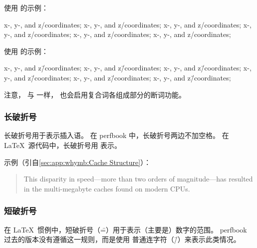 使用 \qco{\\-/} 的示例：

\begin{center}\begin{minipage}{2.55in}\vspace{0.6\baselineskip}
x-, y-, and z\-/coordinates; x-, y-, and z\-/coordinates;
x-, y-, and z\-/coordinates; x-, y-, and z\-/coordinates;
x-, y-, and z\-/coordinates; x-, y-, and z\-/coordinates;
\vspace{0.6\baselineskip}\end{minipage}\end{center}

使用 \qco{\\=/} 的示例：

\begin{center}\begin{minipage}{2.55in}\vspace{0.6\baselineskip}
x-, y-, and z\=/coordinates; x-, y-, and z\=/coordinates;
x-, y-, and z\=/coordinates; x-, y-, and z\=/coordinates;
x-, y-, and z\=/coordinates; x-, y-, and z\=/coordinates;
\vspace{0.6\baselineskip}\end{minipage}\end{center}

注意，\qco{\\=/} 与 \qco{\\-/} 一样，
也会启用复合词各组成部分的断词功能。

\subsubsection{长破折号}
\label{sec:app:styleguide:Em Dash}

长破折号用于表示插入语。
在 perfbook 中，长破折号两边不加空格。
在 \LaTeX\ 源代码中，长破折号用 \qco{---} 表示。

示例（引自\cref{sec:app:whymb:Cache Structure}）：
\begin{quote}
  This disparity in speed---more than two orders of magnitude---has
  resulted in the multi-megabyte caches found on modern CPUs.
\end{quote}

\subsubsection{短破折号}
\label{sec:app;styleguide:En Dash}

在 \LaTeX\ 惯例中，短破折号（\==）用于表示（主要是）数字的范围。
perfbook 过去的版本没有遵循这一规则，而是使用
普通连字符（\=/）来表示此类情况。

